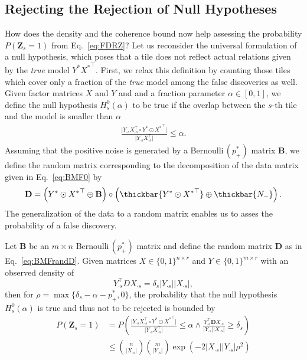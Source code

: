 \subsection{Rejecting the Rejection of Null Hypotheses}\label{sec:TP:rejectNullHyp}
How does the density and the coherence bound now help assessing the  probability $P(\mathbf{Z}_s=1)$ from Eq.~\eqref{eq:FDRZ}? Let us reconsider the universal formulation of a null hypothesis, which poses that a tile does not reflect actual relations given by the \emph{true} model $Y^*{X^*}^\top$. First, we relax this definition by counting those tiles which cover only a fraction of the \emph{true} model among the false discoveries as well. Given factor matrices $X$ and $Y$ and and a fraction parameter $\alpha\in[0,1]$, we define the null hypothesis $H_s^0(\alpha)$ to be true if the overlap between the $s$-th tile and the model is smaller than $\alpha$
\begin{align}\label{eq:nullHyp}
\frac{\bigl\lvert Y_{\cdot s}X_{\cdot s}^\top\circ Y^*\odot{X^*}^\top\bigr\rvert }{\bigl\lvert Y_{\cdot s}X_{\cdot s}^\top\bigr\rvert }\leq \alpha.
\end{align}
Assuming that the positive noise is generated by a Bernoulli$\,(p_+^*)$ matrix $\mathbf{B}$, we define the random matrix corresponding to the decomposition of the data matrix given in Eq.~\eqref{eq:BMF0} by
\begin{align}\label{eq:BMFrandD}
    \mathbf{D}=\left(Y^*\odot {X^*}^\top \oplus \mathbf{B}\right) \circ \left(\thickbar{Y^*\odot {X^*}^\top} \oplus \thickbar{N_-}\right).
\end{align}
The generalization of the data to a random matrix enables us to asses the probability of a false discovery.  
\begin{corollary}\label{thm:densZ}
Let $\mathbf{B}$ be an $m\times n$ Bernoulli$\,(p_+^*)$ matrix and define the random matrix $\mathbf{D}$ as in Eq.~\eqref{eq:BMFrandD}.
Given matrices $X\in\{0,1\}^{n\times r}$ and $Y\in\{0,1\}^{m\times r}$ with an observed density of
\[Y_{\cdot s}^\top DX_{\cdot s}= \delta_s\lvert Y_{\cdot s}\rvert \lvert X_{\cdot s}\rvert ,\] 
then for $\rho = \max\{\delta_s-\alpha-p_+^*,0\}$, the probability that  the null hypothesis $H_s^0(\alpha)$ is true and thus not to be rejected is bounded by
\begin{align*}
P(\mathbf{Z}_s=1)&= P\left(\frac{\bigl\lvert Y_{\cdot s}X_{\cdot s}^\top\circ Y^*\odot{X^*}^\top\bigr\rvert }{\bigl\lvert Y_{\cdot s}X_{\cdot s}^\top\bigr\rvert }\leq \alpha \wedge \frac{Y_{\cdot s}^\top \mathbf{D}X_{\cdot s}}{\lvert Y_{\cdot s}\rvert \lvert X_{\cdot s}\rvert}\geq \delta_s \right)\\
&\leq \binom{n}{\lvert X_{\cdot s}\rvert }\binom{m}{\lvert Y_{\cdot s}\rvert }\exp\left(-2\lvert X_{\cdot s}\rvert \lvert Y_{\cdot s}\rvert \rho^2\right)
\end{align*}
\end{corollary}
